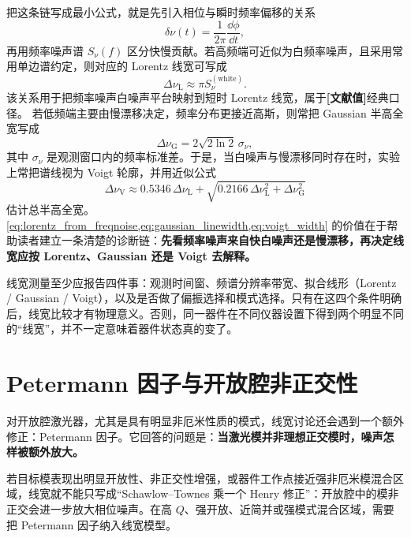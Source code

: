 把这条链写成最小公式，就是先引入相位与瞬时频率偏移的关系
\begin{equation}
\delta \nu(t)=\frac{1}{2\pi}\frac{\dd \phi}{\dd t},
\label{eq:freq_phase_relation}
\end{equation}
再用频率噪声谱 $S_\nu(f)$ 区分快慢贡献。若高频端可近似为白频率噪声，且采用常用单边谱约定，则对应的 Lorentz 线宽可写成
\begin{equation}
\Delta\nu_{\mathrm{L}} \approx \pi S_\nu^{(\mathrm{white})}.
\label{eq:lorentz_from_freqnoise}
\end{equation}
该关系用于把频率噪声白噪声平台映射到短时 Lorentz 线宽，属于\textbf{[文献值]}经典口径\cite{henry1982,kruger1990linewidthmode,coldren2012}。
若低频端主要由慢漂移决定，频率分布更接近高斯，则常把 Gaussian 半高全宽写成
\begin{equation}
\Delta\nu_{\mathrm{G}} = 2\sqrt{2\ln 2}\,\sigma_\nu,
\label{eq:gaussian_linewidth}
\end{equation}
其中 $\sigma_\nu$ 是观测窗口内的频率标准差。于是，当白噪声与慢漂移同时存在时，实验上常把谱线视为 Voigt 轮廓，并用近似公式
\begin{equation}
\Delta\nu_{\mathrm{V}}
\approx
0.5346\,\Delta\nu_{\mathrm{L}}
+
\sqrt{0.2166\,\Delta\nu_{\mathrm{L}}^2+\Delta\nu_{\mathrm{G}}^2}
\label{eq:voigt_width}
\end{equation}
估计总半高全宽\cite{coldren2012}。\cref{eq:lorentz_from_freqnoise,eq:gaussian_linewidth,eq:voigt_width} 的价值在于帮助读者建立一条清楚的诊断链：\textbf{先看频率噪声来自快白噪声还是慢漂移，再决定线宽应按 Lorentz、Gaussian 还是 Voigt 去解释。}

线宽测量至少应报告四件事：观测时间窗、频谱分辨率带宽、拟合线形（Lorentz / Gaussian / Voigt），以及是否做了偏振选择和模式选择。只有在这四个条件明确后，线宽比较才有物理意义。否则，同一器件在不同仪器设置下得到两个明显不同的“线宽”，并不一定意味着器件状态真的变了。

\section{Petermann 因子与开放腔非正交性}
对开放腔激光器，尤其是具有明显非厄米性质的模式，线宽讨论还会遇到一个额外修正：Petermann 因子。它回答的问题是：\textbf{当激光模并非理想正交模时，噪声怎样被额外放大。}

若目标模表现出明显开放性、非正交性增强，或器件工作点接近强非厄米模混合区域，线宽就不能只写成“Schawlow--Townes 乘一个 Henry 修正”：开放腔中的模非正交会进一步放大相位噪声。在高 $Q$、强开放、近简并或强模式混合区域，需要把 Petermann 因子纳入线宽模型。

